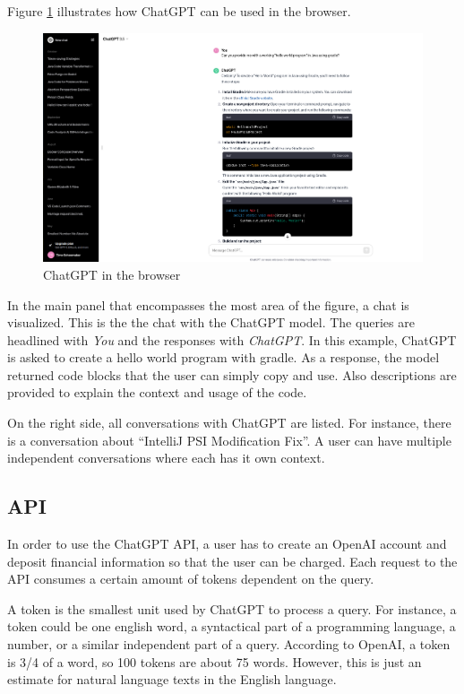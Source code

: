 Figure \ref{fig:chatgpt_browser} illustrates how ChatGPT can be used in the browser.
\begin{figure}
    \centering
\includegraphics[width=\columnwidth]{figures/chapter2/chatgpt_browser.png}
    \caption{ChatGPT in the browser}
    \label{fig:chatgpt_browser}
\end{figure}
In the main panel that encompasses the most area of the figure, a chat is visualized. This is the the chat with the ChatGPT model. The queries are headlined with \textit{You} and the responses with \textit{ChatGPT}. In this example, ChatGPT is asked to create a hello world program with gradle. As a response, the model returned code blocks that the user can simply copy and use. Also descriptions are provided to explain the context and usage of the code.

    On the right side, all conversations with ChatGPT are listed. For instance, there is a conversation about \enquote{IntelliJ PSI Modification Fix}. A user can have multiple independent conversations where each has it own context. 

\subsection{API}
In order to use the ChatGPT \ac{API}, a user has to create an OpenAI account and deposit financial information so that the user can be charged. Each request to the API consumes a certain amount of tokens dependent on the query. 

A token is the smallest unit used by ChatGPT to process a query. For instance, a token could be one english word, a syntactical part of a programming language, a number, or a similar independent part of a query. According to OpenAI, a token is 3/4 of a word, so 100 tokens are about 75 words. However, this is just an estimate for natural language texts in the English language. 

